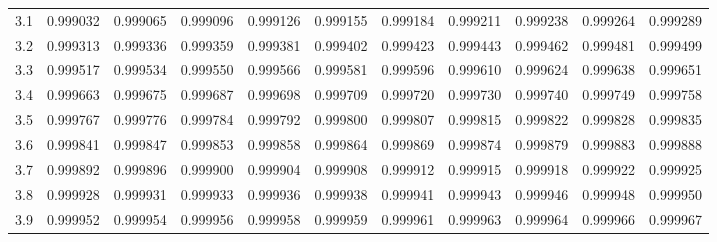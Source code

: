 \documentclass[
]{book}
\theoremstyle{definition}
\theoremstyle{definition}
\theoremstyle{definition}
\theoremstyle{definition}
\theoremstyle{remark}
\begin{document}
\begin{longtable}[]{@{}ccccccccccc@{}}
3.1 & 0.999032 & 0.999065 & 0.999096 & 0.999126 & 0.999155 & 0.999184 & 0.999211 & 0.999238 & 0.999264 & 0.999289 \\
3.2 & 0.999313 & 0.999336 & 0.999359 & 0.999381 & 0.999402 & 0.999423 & 0.999443 & 0.999462 & 0.999481 & 0.999499 \\
3.3 & 0.999517 & 0.999534 & 0.999550 & 0.999566 & 0.999581 & 0.999596 & 0.999610 & 0.999624 & 0.999638 & 0.999651 \\
3.4 & 0.999663 & 0.999675 & 0.999687 & 0.999698 & 0.999709 & 0.999720 & 0.999730 & 0.999740 & 0.999749 & 0.999758 \\
3.5 & 0.999767 & 0.999776 & 0.999784 & 0.999792 & 0.999800 & 0.999807 & 0.999815 & 0.999822 & 0.999828 & 0.999835 \\
3.6 & 0.999841 & 0.999847 & 0.999853 & 0.999858 & 0.999864 & 0.999869 & 0.999874 & 0.999879 & 0.999883 & 0.999888 \\
3.7 & 0.999892 & 0.999896 & 0.999900 & 0.999904 & 0.999908 & 0.999912 & 0.999915 & 0.999918 & 0.999922 & 0.999925 \\
3.8 & 0.999928 & 0.999931 & 0.999933 & 0.999936 & 0.999938 & 0.999941 & 0.999943 & 0.999946 & 0.999948 & 0.999950 \\
3.9 & 0.999952 & 0.999954 & 0.999956 & 0.999958 & 0.999959 & 0.999961 & 0.999963 & 0.999964 & 0.999966 & 0.999967 \\
\bottomrule
\end{longtable}
\end{document}
